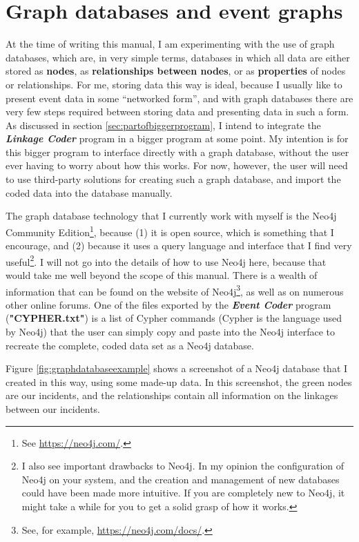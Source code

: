 \documentclass{memoir}
\begin{document}
\section{Graph databases and event graphs}
\label{sec:graphdatabasesandeventgraphs}

At the time of writing this manual, I am experimenting with the use of graph databases, which are, in very simple terms, databases in which all data are either stored as \textbf{nodes}, as \textbf{relationships between nodes}, or as \textbf{properties} of nodes or relationships. For me, storing data this way is ideal, because I usually like to present event data in some ``networked form'', and with graph databases there are very few steps required between storing data and presenting data in such a form. As discussed in section \ref{sec:partofbiggerprogram}, I intend to integrate the \textbf{\emph{Linkage Coder}} program in a bigger program at some point. My intention is for this bigger program to interface directly with a graph database, without the user ever having to worry about how this works. For now, however, the user will need to use third-party solutions for creating such a graph database, and import the coded data into the database manually.

The graph database technology that I currently work with myself is the Neo4j Community Edition\footnote{See \url{https://neo4j.com/}.}, because (1) it is open source, which is something that I encourage, and (2) because it uses a query language and interface that I find very useful\footnote{I also see important drawbacks to Neo4j. In my opinion the configuration of Neo4j on your system, and the creation and management of new databases could have been made more intuitive. If you are completely new to Neo4j, it might take a while for you to get a solid grasp of how it works.}. I will not go into the details of how to use Neo4j here, because that would take me well beyond the scope of this manual. There is a wealth of information that can be found on the website of Neo4j\footnote{See, for example, \url{https://neo4j.com/docs/}.}, as well as on numerous other online forums. One of the files exported by the \emph{\textbf{Event Coder}} program (\textbf{"CYPHER.txt"}) is a list of Cypher commands (Cypher is the language used by Neo4j) that the user can simply copy and paste into the Neo4j interface to recreate the complete, coded data set as a Neo4j database.    

Figure \ref{fig:graphdatabaseexample} shows a screenshot of a Neo4j database that I created in this way, using some made-up data. In this screenshot, the green nodes are our incidents, and the relationships contain all information on the linkages between our incidents.
\end{document}
